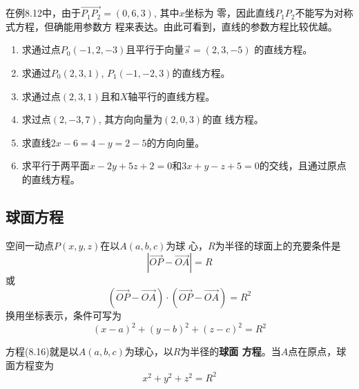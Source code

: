 在例8.12中，由于$\Vec{P_1P_2}=(0,6,3)$, 其中$x$坐标为
零，因此直线$P_1P_2$不能写为对称式方程，但确能用参数方
程来表达。由此可看到，直线的参数方程比较优越。


\begin{ex}
\begin{enumerate}
    \item 求通过点$P_0(-1,2,-3)$且平行于向量$\vec{s}=(2,3,-5)$
    的直线方程。
    \item 求通过$P_0(2,3,1)$, $P_1(-1,-2,3)$的直线方程。
    \item 求通过点$(2,3,1)$且和$X$轴平行的直线方程。
    \item 求过点$(2,-3,7)$, 其方向向量为$(2,0,3)$的直
    线方程。
    \item 求直线$2x-6=4-y=2-5$的方向向量。
    \item 求平行于两平面$x-2y+5z+2=0$和$3x+y-z
    +5=0$的交线，且通过原点的直线方程。
\end{enumerate}
\end{ex}


\subsection{球面方程}
空间一动点$P(x,y,z)$在以$A(a,b,c)$为球
心，$R$为半径的球面上的充要条件是
\[|\Vec{OP}-\Vec{OA}|=R\]
或
\[(\Vec{OP}-\Vec{OA})\cdot (\Vec{OP}-\Vec{OA})=R^2\]
换用坐标表示，条件可写为
\begin{equation}
    (x-a)^2+(y-b)^2+(z-c)^2=R^2
\end{equation}

\begin{figure}[htp]
    \centering
{}
    \caption{}
\end{figure}


方程(8.16)就是以$A(a,b,c)$为球心，以$R$为半径的\textbf{球面
方程}。当$A$点在原点，球面方程变为
\[    x^2+y^2+z^2=R^2\]



